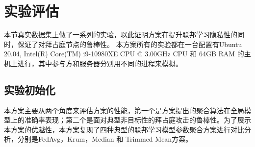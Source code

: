 
\begin{table}
	\centering
	\caption{与现有方案在特定属性上的粗粒度比较}
	\label{detail-cmp}
\end{table}

\section{实验评估}\label{eva}
本节真实数据集上做了一系列的实验，以此证明方案在提升联邦学习隐私性的同时，保证了对拜占庭节点的鲁棒性。
本方案所有的实验都在一台配置有Ubuntu 20.04, Intel(R) Core(TM) i9-10980XE CPU @ 3.00GHz CPU 和 64GB RAM 的主机上进行，其中参与方和服务器分别用不同的进程来模拟。

\subsection{实验初始化}
本方案主要从两个角度来评估方案的性能，第一个是方案提出的聚合算法在全局模型上的准确率表现；第二个是面对典型非目标性的拜占庭攻击的鲁棒性。为了展示本方案的优越性，本方案复现了四种典型的联邦学习模型参数聚合方案进行对比分析，分别是FedAvg，Krum，Median 和 Trimmed Mean方案。

